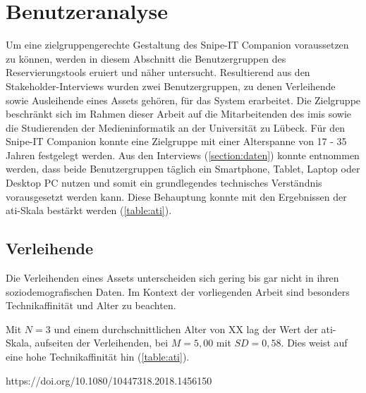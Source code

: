 
\section{Benutzeranalyse}
\label{section:benutzer}
Um eine zielgruppengerechte Gestaltung des Snipe-IT Companion voraussetzen zu können, werden in
diesem Abschnitt die Benutzergruppen des Reservierungstools eruiert und näher untersucht.
Resultierend aus den Stakeholder-Interviews wurden zwei Benutzergruppen, zu denen Verleihende sowie
Ausleihende eines Assets gehören, für das System erarbeitet. Die Zielgruppe beschränkt sich im
Rahmen dieser Arbeit auf die Mitarbeitenden des \ac{imis} sowie die Studierenden der
Medieninformatik an der Universität zu Lübeck. Für den Snipe-IT Companion konnte eine Zielgruppe mit
einer Alterspanne von 17 - 35 Jahren festgelegt werden. Aus den Interviews (\ref{section:daten})
konnte entnommen werden, dass beide Benutzergruppen täglich ein Smartphone, Tablet, Laptop oder
Desktop PC nutzen und somit ein grundlegendes technisches Verständnis vorausgesetzt werden kann.
Diese Behauptung konnte mit den Ergebnissen der \ac{ati}-Skala bestärkt werden (\ref{table:ati}).


\subsection{Verleihende}
Die Verleihenden eines Assets unterscheiden sich gering bis gar nicht in ihren soziodemografischen
Daten. Im Kontext der vorliegenden Arbeit sind besonders Technikaffinität und Alter zu beachten.

Mit $N=3$ und einem durchschnittlichen Alter von XX lag der Wert der \ac{ati}-Skala, aufseiten der
Verleihenden, bei $M=5,00$ mit $SD=0,58$. Dies weist auf eine hohe Technikaffinität hin
(\ref{table:ati}).

\cite{franke_personal_2019}
https://doi.org/10.1080/10447318.2018.1456150 

